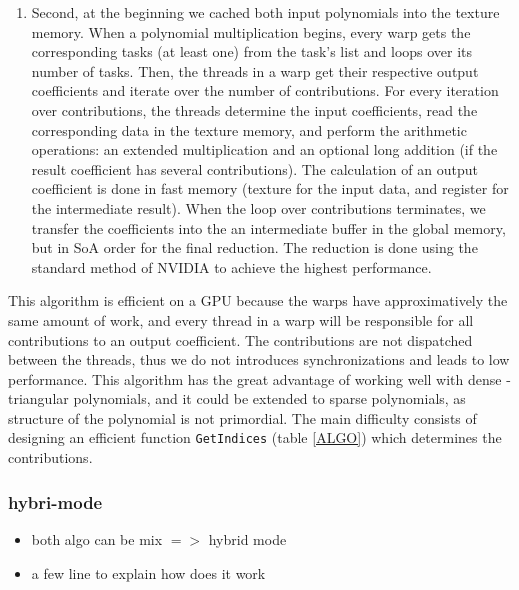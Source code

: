 \documentclass[oribibl]{llncs2e/llncs}
\begin{document}
\begin{enumerate}
\item  Second, at the beginning we  cached both input polynomials into the texture memory. 
When a polynomial multiplication begins,  every warp gets the corresponding tasks (at least one) from the task's list and loops over its number of tasks. Then,
the threads in a warp get their respective output coefficients and iterate over the number of  contributions.
For every iteration over contributions, the threads determine the input coefficients, read the corresponding data in the texture memory, and perform the arithmetic operations: an extended multiplication and an optional long addition (if the result coefficient has several contributions). The calculation of an output coefficient  is  done in fast memory (texture for the input data, and register for the intermediate result). 
When the loop over contributions terminates,  we transfer the coefficients into the an intermediate buffer in the global memory, but in SoA  order for the final reduction. 
The reduction is done using the standard method of NVIDIA \cite{CUDAReduction} to achieve the highest performance.




\end{enumerate}


This algorithm is efficient on a GPU because the warps have approximatively the same amount of work,  and every thread in a warp will be responsible for all contributions to an output coefficient.
The contributions are not dispatched between the threads, thus we do not  introduces   synchronizations and leads to low performance. 
This  algorithm has the great advantage of working well with dense - triangular polynomials, and it could be extended to sparse polynomials, as structure of the polynomial is not primordial.
The main difficulty consists  of designing an efficient function \texttt{GetIndices} (table \ref{ALGO}) which determines the contributions.

\subsubsection{hybri-mode}

\begin{itemize}
\item both algo can be mix  $=>$ hybrid mode
\item a few line to explain how does it work
\end{itemize}
\end{document}
